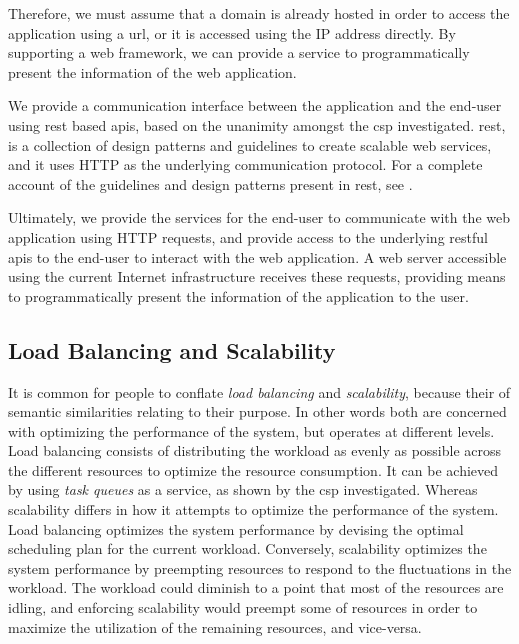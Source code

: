 \documentclass[12pt, titlepage]{uo_temp}
\begin{document}
     Therefore, we must assume that a domain is already hosted in order to access the
     application using a \gls{url}, or it is accessed using the IP address directly. By
     supporting a web framework, we can provide a service to programmatically present the
     information of the web application.

     We provide a communication interface between the application and the end-user using
     \gls{rest} based \gls{api}s, based on the unanimity amongst the \gls{csp}
     investigated.  \gls{rest}, is a collection of design patterns and guidelines to
     create scalable web services, and it uses HTTP as the underlying communication
     protocol. For a complete account of the guidelines and design patterns present
     in \gls{rest}, see \cite{richardson2008restful}.

     Ultimately, we provide the services for the end-user to communicate with the web
     application using HTTP requests, and provide access to the underlying \gls{rest}ful
     \gls{api}s to the end-user to interact with the web application. A web server
     accessible using the current Internet infrastructure receives these requests,
     providing means to programmatically present the information of the application to the
     user.

     \subsection{Load Balancing and Scalability}
     It is common for people to conflate \emph{load balancing} and \emph{scalability},
     because their of semantic similarities relating to their purpose. In other words both
     are concerned with optimizing the performance of the system, but operates at
     different levels. Load balancing consists of distributing the workload as evenly as
     possible across the different resources to optimize the resource consumption. It can
     be achieved by using \emph{task queues} as a service, as shown by the \gls{csp}
     investigated. Whereas scalability differs in how it attempts to optimize the
     performance of the system. Load balancing optimizes the system performance by
     devising the optimal scheduling plan for the current workload. Conversely,
     scalability optimizes the system performance by preempting resources to respond to
     the fluctuations in the workload. The workload could diminish to a point that most of
     the resources are idling, and enforcing scalability would preempt some of
     resources in order to maximize the utilization of the remaining resources, and
     vice-versa.
\end{document}
